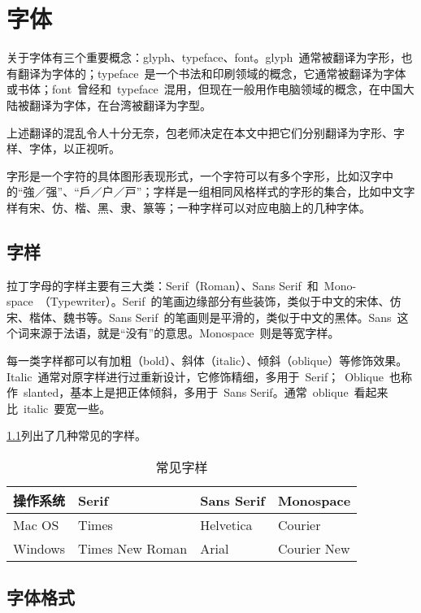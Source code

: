 \newcommand{\MF}{MetaFont}
\chapter{字体}

关于字体有三个重要概念：glyph、typeface、font。glyph~通常被翻译为字形，也有翻译为字体的；typeface~是一个书法和印刷领域的概念，它通常被翻译为字体或书体；font~曾经和~typeface~混用，但现在一般用作电脑领域的概念，在中国大陆被翻译为字体，在台湾被翻译为字型。

上述翻译的混乱令人十分无奈，包老师决定在本文中把它们分别翻译为字形、字样、字体，以正视听。

字形是一个字符的具体图形表现形式，一个字符可以有多个字形，比如汉字中的“強／强”、“戶／户／戸”；字样是一组相同风格样式的字形的集合，比如中文字样有宋、仿、楷、黑、隶、篆等；一种字样可以对应电脑上的几种字体。

\section{字样}
\label{sec:typeface}
拉丁字母的字样主要有三大类：Serif（Roman）、Sans Serif~和~Mono-space~（Typewriter）。Serif~的笔画边缘部分有些装饰，类似于中文的宋体、仿宋、楷体、魏书等。Sans Serif~的笔画则是平滑的，类似于中文的黑体。Sans~这个词来源于法语，就是“没有”的意思。Monospace~则是等宽字样。

每一类字样都可以有加粗（bold）、斜体（italic）、倾斜（oblique）等修饰效果。Italic~通常对原字样进行过重新设计，它修饰精细，多用于~Serif；~Oblique~也称作~slanted，基本上是把正体倾斜，多用于~Sans Serif。通常~oblique~看起来比~italic~要宽一些。

\ref{tab:typeface}列出了几种常见的字样。

\begin{table}[htbp]
\caption{常见字样}
\label{tab:typeface}
\centering
\begin{tabular}{llll}
    \toprule
    操作系统 & Serif           & Sans Serif & Monospace \\
    \midrule
    Mac OS   & Times           & Helvetica  & Courier \\
    Windows  & Times New Roman & Arial      & Courier New \\
    \bottomrule
\end{tabular}
\end{table}

\section{字体格式}
\label{sec:font}

